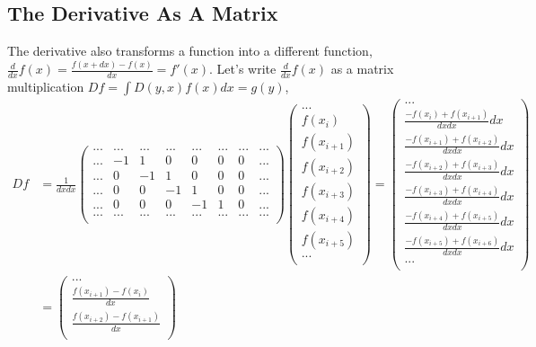 \documentclass[12pt]{article}
\begin{document}
\subsection{The Derivative As A Matrix}
The derivative also transforms a function into a different function, $\frac{d}{dx}f(x) = \frac{f(x+dx) - f(x)}{dx} = f'(x)$. Let's write $\frac{d}{dx}f(x)$ as a matrix multiplication $Df = \int D(y,x)f(x)dx = g(y)$,
\begin{equation}
\begin{split}
Df &= \frac{1}{dxdx} 
\begin{pmatrix}
... & ... & ... & ... & ... & ... & ... & ... \\
... & -1 & 1 & 0 & 0 & 0 & 0 & ...\\
... & 0 & -1 & 1 & 0 & 0 & 0 & ... \\
... & 0 & 0 & -1 & 1 & 0 & 0 & ... \\
... & 0 & 0 & 0 & -1 & 1 & 0 & ... \\
... & ... & ... & ... & ... & ... & ... & ... \\
\end{pmatrix}
\begin{pmatrix}
... \\
f(x_i) \\
f(x_{i+1}) \\
f(x_{i+2}) \\
f(x_{i+3}) \\
f(x_{i+4}) \\
f(x_{i+5}) \\
... \\
\end{pmatrix}
=
\begin{pmatrix}
... \\
\frac{-f(x_i) + f(x_{i+1})}{dxdx}dx \\
\frac{-f(x_{i+1}) + f(x_{i+2})}{dxdx}dx \\
\frac{-f(x_{i+2}) + f(x_{i+3})}{dxdx}dx \\
\frac{-f(x_{i+3}) + f(x_{i+4})}{dxdx}dx \\
\frac{-f(x_{i+4}) + f(x_{i+5})}{dxdx}dx \\
\frac{-f(x_{i+5}) + f(x_{i+6})}{dxdx}dx \\
... \\
\end{pmatrix}\\
&=
\begin{pmatrix}
... \\
\frac{f(x_{i+1}) - f(x_i) }{dx} \\
\frac{f(x_{i+2}) - f(x_{i+1})}{dx} \\

\end{pmatrix}
\end{split}
\end{equation}
\end{document}
